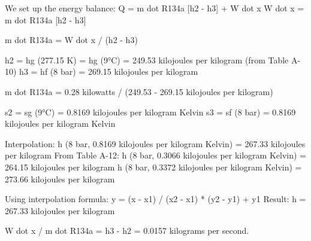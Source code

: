 We set up the energy balance:  
Q = m dot R134a [h2 - h3] + W dot x  
W dot x = m dot R134a [h2 - h3]  

m dot R134a = W dot x / (h2 - h3)  

h2 = hg (277.15 K) = hg (9°C) = 249.53 kilojoules per kilogram (from Table A-10)  
h3 = hf (8 bar) = 269.15 kilojoules per kilogram  

m dot R134a = 0.28 kilowatts / (249.53 - 269.15 kilojoules per kilogram)  

s2 = sg (9°C) = 0.8169 kilojoules per kilogram Kelvin  
s3 = sf (8 bar) = 0.8169 kilojoules per kilogram Kelvin  

Interpolation:  
h (8 bar, 0.8169 kilojoules per kilogram Kelvin) = 267.33 kilojoules per kilogram  
From Table A-12:  
h (8 bar, 0.3066 kilojoules per kilogram Kelvin) = 264.15 kilojoules per kilogram  
h (8 bar, 0.3372 kilojoules per kilogram Kelvin) = 273.66 kilojoules per kilogram  

Using interpolation formula:  
y = (x - x1) / (x2 - x1) * (y2 - y1) + y1  
Result: h = 267.33 kilojoules per kilogram  

W dot x / m dot R134a = h3 - h2 = 0.0157 kilograms per second.